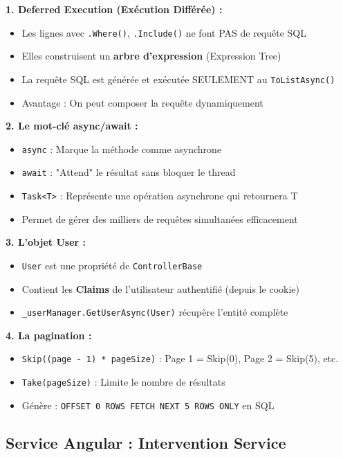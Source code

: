 \documentclass[12pt,a4paper]{article}
\begin{document}
\begin{infobox}[title={\faLightbulb\ Concepts Avancés Expliqués}]
\textbf{1. Deferred Execution (Exécution Différée) :}
\begin{itemize}
    \item Les lignes avec \texttt{.Where()}, \texttt{.Include()} ne font PAS de requête SQL
    \item Elles construisent un \textbf{arbre d'expression} (Expression Tree)
    \item La requête SQL est générée et exécutée SEULEMENT au \texttt{ToListAsync()}
    \item Avantage : On peut composer la requête dynamiquement
\end{itemize}

\textbf{2. Le mot-clé async/await :}
\begin{itemize}
    \item \texttt{async} : Marque la méthode comme asynchrone
    \item \texttt{await} : "Attend" le résultat sans bloquer le thread
    \item \texttt{Task<T>} : Représente une opération asynchrone qui retournera T
    \item Permet de gérer des milliers de requêtes simultanées efficacement
\end{itemize}

\textbf{3. L'objet User :}
\begin{itemize}
    \item \texttt{User} est une propriété de \texttt{ControllerBase}
    \item Contient les \textbf{Claims} de l'utilisateur authentifié (depuis le cookie)
    \item \texttt{\_userManager.GetUserAsync(User)} récupère l'entité complète
\end{itemize}

\textbf{4. La pagination :}
\begin{itemize}
    \item \texttt{Skip((page - 1) * pageSize)} : Page 1 = Skip(0), Page 2 = Skip(5), etc.
    \item \texttt{Take(pageSize)} : Limite le nombre de résultats
    \item Génère : \texttt{OFFSET 0 ROWS FETCH NEXT 5 ROWS ONLY} en SQL
\end{itemize}
\end{infobox}

\newpage

\subsection{Service Angular : Intervention Service}
\end{document}
